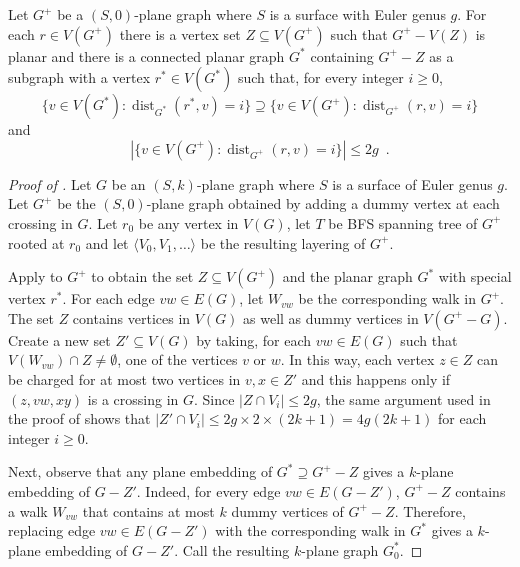 \documentclass{patmorin}
\DeclareMathOperator{\dist}{dist}
\begin{document}
\begin{lem} 
Let $G^+$ be a $(S,0)$-plane graph where $S$ is a surface with Euler genus $g$. 
For each $r\in V(G^+)$ there is a vertex set $Z\subseteq V(G^+)$ such that $G^+-V(Z)$ is planar and there is a connected planar graph $G^*$ containing  $G^+-Z$ as a subgraph with a vertex $r^*\in V(G^*)$ such that, for every integer $i\ge 0$,
\[  \{v\in V(G^*): \dist_{G^*}(r^*,v) = i\} \supseteq \{v\in V(G^+): \dist_{G^+}(r,v) = i\} \]
and
\[ |\{v\in V(G^+): \dist_{G^+}(r,v) = i\}| \le 2g \enspace . \]

\end{lem}

\begin{proof}[Proof of ]
  Let $G$ be an $(S,k)$-plane graph where $S$ is a surface of Euler genus $g$.  Let $G^+$ be the $(S,0)$-plane graph obtained by adding a dummy vertex at each crossing in $G$.  Let $r_0$ be any vertex in $V(G)$, let $T$ be BFS spanning tree of $G^+$ rooted at $r_0$ and let $\langle V_0,V_1,\ldots\rangle$ be the resulting layering of $G^+$.
    
  Apply  to $G^{+}$ to obtain the set $Z\subseteq V(G^{+})$ and the planar graph $G^*$ with special vertex $r^*$.  For each edge $vw\in E(G)$, let $W_{vw}$ be the corresponding walk in $G^+$. The set $Z$ contains vertices in $V(G)$ as well as dummy vertices in $V(G^+-G)$. Create a new set $Z'\subseteq V(G)$ by taking, for each $vw\in E(G)$ such that $V(W_{vw})\cap Z\neq\emptyset$, one of the vertices $v$ or $w$.  In this way, each vertex $z\in Z$ can be charged for at most two vertices in $v,x\in Z'$ and this happens only if $(z,vw,xy)$ is a crossing in $G$.
  Since $|Z\cap V_i| \le 2g$, the same argument used in the proof of  shows that $|Z'\cap V_i|\le 2g\times 2\times (2k+1) = 4g(2k+1)$ for each integer $i\ge 0$.
  
  
  Next, observe that any plane embedding of $G^*\supseteq G^+-Z$ gives a $k$-plane embedding of $G-Z'$. Indeed, for every edge $vw\in E(G-Z')$, $G^+-Z$ contains a walk $W_{vw}$ that contains at most $k$ dummy vertices of $G^+-Z$.  Therefore, replacing edge $vw\in E(G-Z')$ with the corresponding walk in $G^*$ gives a $k$-plane embedding of $G-Z'$.  Call the resulting $k$-plane graph $G^*_0$.
  

\end{proof}
\end{document}
